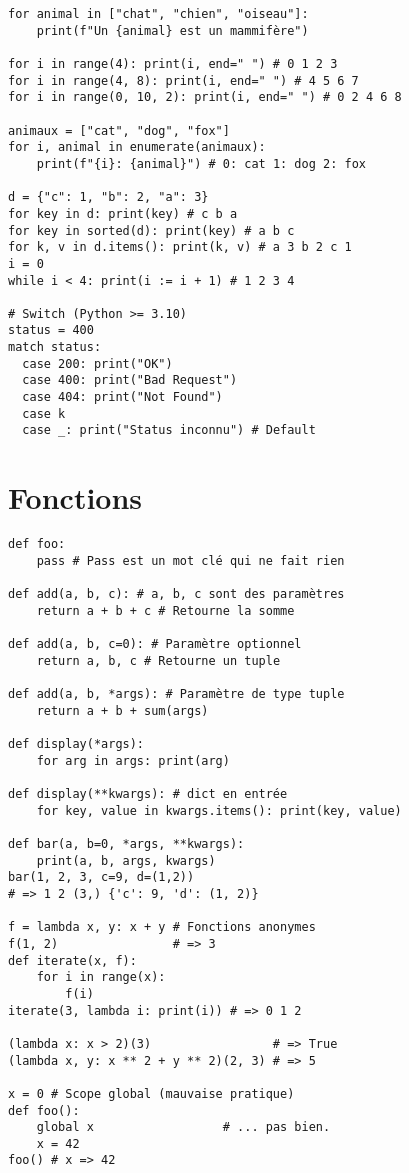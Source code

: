 \documentclass[9pt]{extarticle}
\begin{document}
\begin{multicols*}{4}
\begin{lstlisting}
for animal in ["chat", "chien", "oiseau"]:
    print(f"Un {animal} est un mammifère")

for i in range(4): print(i, end=" ") # 0 1 2 3
for i in range(4, 8): print(i, end=" ") # 4 5 6 7
for i in range(0, 10, 2): print(i, end=" ") # 0 2 4 6 8

animaux = ["cat", "dog", "fox"]
for i, animal in enumerate(animaux):
    print(f"{i}: {animal}") # 0: cat 1: dog 2: fox

d = {"c": 1, "b": 2, "a": 3}
for key in d: print(key) # c b a
for key in sorted(d): print(key) # a b c
for k, v in d.items(): print(k, v) # a 3 b 2 c 1
i = 0
while i < 4: print(i := i + 1) # 1 2 3 4

# Switch (Python >= 3.10)
status = 400
match status:
  case 200: print("OK")
  case 400: print("Bad Request")
  case 404: print("Not Found")
  case k
  case _: print("Status inconnu") # Default
\end{lstlisting}

\section*{Fonctions}
\begin{lstlisting}
def foo:
    pass # Pass est un mot clé qui ne fait rien

def add(a, b, c): # a, b, c sont des paramètres
    return a + b + c # Retourne la somme

def add(a, b, c=0): # Paramètre optionnel
    return a, b, c # Retourne un tuple

def add(a, b, *args): # Paramètre de type tuple
    return a + b + sum(args)

def display(*args):
    for arg in args: print(arg)

def display(**kwargs): # dict en entrée
    for key, value in kwargs.items(): print(key, value)

def bar(a, b=0, *args, **kwargs):
    print(a, b, args, kwargs)
bar(1, 2, 3, c=9, d=(1,2))
# => 1 2 (3,) {'c': 9, 'd': (1, 2)}

f = lambda x, y: x + y # Fonctions anonymes
f(1, 2)                # => 3
def iterate(x, f):
    for i in range(x):
        f(i)
iterate(3, lambda i: print(i)) # => 0 1 2

(lambda x: x > 2)(3)                 # => True
(lambda x, y: x ** 2 + y ** 2)(2, 3) # => 5

x = 0 # Scope global (mauvaise pratique)
def foo():
    global x                  # ... pas bien.
    x = 42
foo() # x => 42


\end{lstlisting}
\end{multicols*}
\end{document}
